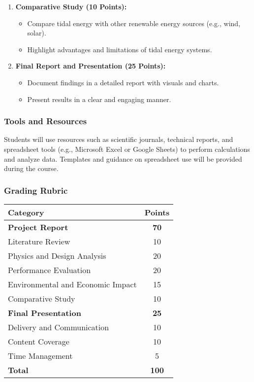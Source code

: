 \documentclass[11pt]{article}
\begin{document}
\begin{enumerate}
    \item \textbf{Comparative Study (10 Points):}
    \begin{itemize}
        \item Compare tidal energy with other renewable energy sources (e.g., wind, solar).
        \item Highlight advantages and limitations of tidal energy systems.
    \end{itemize}

    \item \textbf{Final Report and Presentation (25 Points):}
    \begin{itemize}
        \item Document findings in a detailed report with visuals and charts.
        \item Present results in a clear and engaging manner.
    \end{itemize}
\end{enumerate}

\subsubsection*{Tools and Resources}
Students will use resources such as scientific journals, technical reports, and spreadsheet tools (e.g., Microsoft Excel or Google Sheets) to perform calculations and analyze data. Templates and guidance on spreadsheet use will be provided during the course.

\subsubsection*{Grading Rubric}
\begin{center}
\begin{tabular}{|l|c|}
\hline
\textbf{Category} & \textbf{Points} \\
\hline
\textbf{Project Report} & \textbf{70} \\
Literature Review & 10 \\
Physics and Design Analysis & 20 \\
Performance Evaluation & 20 \\
Environmental and Economic Impact & 15 \\
Comparative Study & 10 \\
 \hline
        \textbf{Final Presentation} & \textbf{25} \\
        Delivery and Communication & 10 \\
        Content Coverage & 10 \\
        Time Management & 5 \\
        \hline
\hline
\textbf{Total} & \textbf{100} \\
\hline
\end{tabular}
\end{center}
\end{document}
